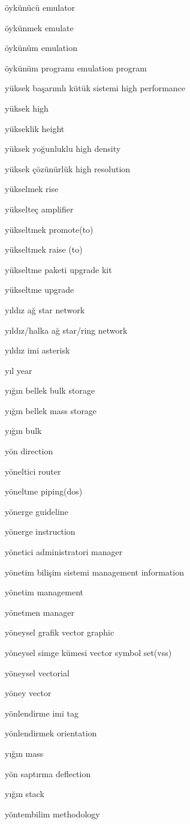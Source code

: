 \documentclass[12pt,fleqn]{article}\usepackage{../../common}
\begin{document}
öykünücü emulator

öykünmek emulate

öykünüm emulation

öykünüm programı emulation program

yüksek başarımlı kütük sistemi high performance

yüksek high

yükseklik height

yüksek yoğunluklu high density

yüksek çözünürlük high resolution

yükselmek rise

yükselteç amplifier

yükseltmek promote(to)

yükseltmek raise (to)

yükseltme paketi upgrade kit

yükseltme upgrade

yıldız ağ star network

yıldız/halka ağ star/ring network

yıldız imi asterisk

yıl year

yığın bellek bulk storage

yığın bellek mass storage

yığın bulk

yön direction

yöneltici router

yöneltme piping(dos)

yönerge guideline

yönerge instruction

yönetici administratori manager

yönetim bilişim sistemi management information

yönetim management

yönetmen manager

yöneysel grafik vector graphic

yöneysel simge kümesi vector symbol set(vss)

yöneysel vectorial

yöney vector

yönlendirme imi tag

yönlendirmek orientation

yığın mass

yön saptırma deflection

yığın stack

yöntembilim methodology
\end{document}
